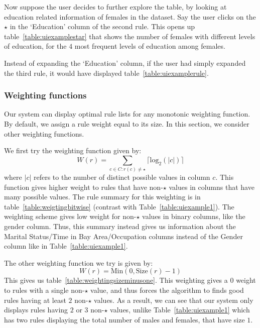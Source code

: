 Now suppose the user decides to further explore the table, by looking at education related information of females in the dataset. Say the user clicks on the $\star$ in the `Education' column of the second rule. This opens up table~\ref{table:uiexamplestar} that shows the number of females with different levels of education, for the $4$ most frequent levels of education among females.

Instead of expanding the `Education' column, if the user had simply expanded the third rule, it would have displayed table~\ref{table:uiexamplerule}. 


\subsubsection{Weighting functions}
Our system can display optimal rule lists for any monotonic weighting function. By default, we assign a rule weight equal to its size. In this section, we consider other weighting functions. 

We first try the weighting function given by:
$$W(r) = \sum_{c \in C : r(c) \neq \star} \lceil \text{log}_2(|c|) \rceil$$ where $|c|$ refers to the number of distinct possible values in column $c$. This function gives higher weight to rules that have non-$\star$ values in columns that have many possible values. The rule summary for this weighting is in table~\ref{table:weigtingbitwise} (contrast with Table~\ref{table:uiexample1}). The weighting scheme gives low weight for non-$\star$ values in binary columns, like the gender column. Thus, this summary instead gives us information about the Marital Status/Time in Bay Area/Occupation columns instead of the Gender column like in Table~\ref{table:uiexample1}.  

The other weighting function we try is given by:
$$W(r) = \text{Min}(0, \text{Size}(r) - 1)$$
This gives us table~\ref{table:weightingsizeminusone}. This weighting gives a $0$ weight to rules with a single non-$\star$ value, and thus forces the algorithm to finds good rules having at least $2$ non-$\star$ values. As a result, we can see that our system only displays rules having $2$ or $3$ non-$\star$ values, unlike Table~\ref{table:uiexample1} which has two rules displaying the total number of males and females, that have size $1$.




